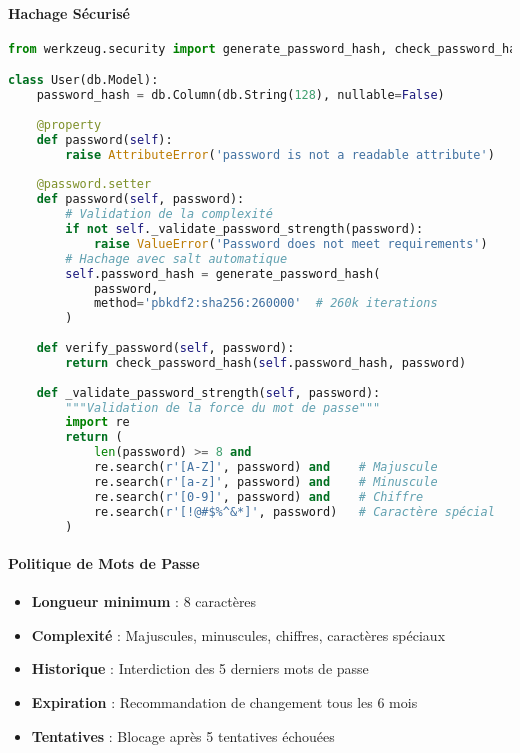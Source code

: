 \paragraph{Hachage Sécurisé}
\begin{lstlisting}[language=python]
from werkzeug.security import generate_password_hash, check_password_hash

class User(db.Model):
    password_hash = db.Column(db.String(128), nullable=False)
    
    @property
    def password(self):
        raise AttributeError('password is not a readable attribute')
    
    @password.setter
    def password(self, password):
        # Validation de la complexité
        if not self._validate_password_strength(password):
            raise ValueError('Password does not meet requirements')
        # Hachage avec salt automatique
        self.password_hash = generate_password_hash(
            password, 
            method='pbkdf2:sha256:260000'  # 260k iterations
        )
    
    def verify_password(self, password):
        return check_password_hash(self.password_hash, password)
    
    def _validate_password_strength(self, password):
        """Validation de la force du mot de passe"""
        import re
        return (
            len(password) >= 8 and
            re.search(r'[A-Z]', password) and    # Majuscule
            re.search(r'[a-z]', password) and    # Minuscule  
            re.search(r'[0-9]', password) and    # Chiffre
            re.search(r'[!@#$%^&*]', password)   # Caractère spécial
        )
\end{lstlisting}

\paragraph{Politique de Mots de Passe}
\begin{itemize}
    \item \textbf{Longueur minimum} : 8 caractères
    \item \textbf{Complexité} : Majuscules, minuscules, chiffres, caractères spéciaux
    \item \textbf{Historique} : Interdiction des 5 derniers mots de passe
    \item \textbf{Expiration} : Recommandation de changement tous les 6 mois
    \item \textbf{Tentatives} : Blocage après 5 tentatives échouées
\end{itemize}

